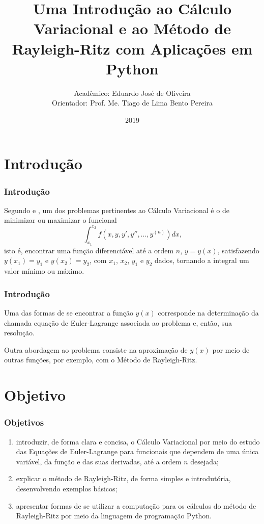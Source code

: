 \documentclass{beamer}
\title[Cálculo Variacional e o Método de Rayleigh-Ritz]{Uma Introdução ao Cálculo Variacional e ao Método de Rayleigh-Ritz com Aplicações em Python}
\author[Eduardo José de Oliveira]{
	Acadêmico: Eduardo José de Oliveira\\
	Orientador: Prof. Me. Tiago de Lima Bento Pereira
}
\institute[Universidade Estadual de Goiás]{
	UNIVERSIDADE ESTADUAL DE GOIÁS\\
  	Câmpus Anápolis de Ciências Exatas e Tecnológicas Henrique Santillo \\
  	\vfill
  	Curso de Matemática
}
\date[2019]{2019}
\newif\ifcompilepause
\newcommand{\cpause}{
	\ifcompilepause
	\pause
	\fi
}
\begin{document}
	\begin{frame}[plain]
	  \titlepage
	\end{frame}

	\section{Introdução}
	\begin{frame}
		\frametitle{Introdução}
		
		\justify
		Segundo  e , um dos problemas pertinentes ao Cálculo Variacional é o de minimizar ou maximizar o funcional
		$$
			\int_{x_1}^{x_2} f(x, y, y', y'', \dots, y^{(n)})dx\text{,}
		$$
		isto é, encontrar uma função diferenciável até a ordem $n$, $y=y(x)$, satisfazendo $y(x_1)=y_1$ e $y(x_2)=y_2$, com $x_1$, $x_2$, $y_1$ e $y_2$ dados, tornando a integral um valor mínimo ou máximo.
	\end{frame}
	
	\begin{frame}
		\frametitle{Introdução}
		\justify

		Uma das formas de se encontrar a função $y(x)$ corresponde na determinação da chamada equação de Euler-Lagrange associada ao problema e, então, sua resolução.
		\vspace{10pt}
		\cpause
		
		Outra abordagem ao problema consiste na aproximação de $y(x)$ por meio de outras funções, por exemplo, com o Método de Rayleigh-Ritz.
	\end{frame}
	
	\section{Objetivo}
	\begin{frame}
		\frametitle{Objetivos}
	
		\begin{enumerate}
			\justifying
			\item introduzir, de forma clara e concisa, o Cálculo Variacional por meio do estudo das Equações de Euler-Lagrange para funcionais que dependem de uma única variável, da função e das suas derivadas, até a ordem $n$ desejada;
			
			\item explicar o método de Rayleigh-Ritz, de forma simples e introdutória, desenvolvendo exemplos básicos;
			
			\item apresentar formas de se utilizar a computação para os cálculos do método de Rayleigh-Ritz por meio da linguagem de programação Python.
		\end{enumerate}
	\end{frame}
\end{document}
